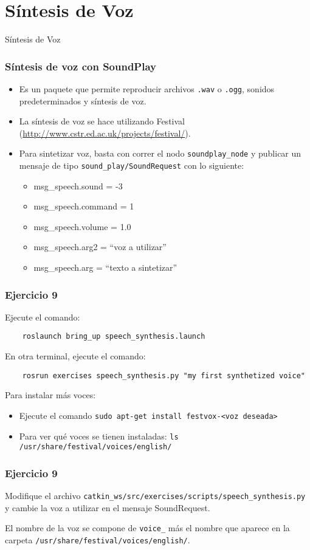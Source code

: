 \section{Síntesis de Voz}

\begin{frame}
  \Huge
  Síntesis de Voz
\end{frame}

\begin{frame}\frametitle{Síntesis de voz con SoundPlay}
  \begin{itemize}
  \item Es un paquete que permite reproducir archivos \texttt{.wav} o \texttt{.ogg}, sonidos predeterminados y síntesis de voz.
  \item La síntesis de voz se hace utilizando Festival (\url{http://www.cstr.ed.ac.uk/projects/festival/}).
  \item Para sintetizar voz, basta con correr el nodo \texttt{soundplay\_node} y publicar un mensaje de tipo \texttt{sound\_play/SoundRequest} con lo siguiente:
    \begin{itemize}
    \item msg\_speech.sound   = -3                 
    \item msg\_speech.command = 1                  
    \item msg\_speech.volume  = 1.0                
    \item msg\_speech.arg2    = ``voz a utilizar''
    \item msg\_speech.arg = ``texto a sintetizar''
    \end{itemize}
  \end{itemize}
\end{frame}

\begin{frame}[containsverbatim]\frametitle{Ejercicio 9}
  Ejecute el comando:
  \begin{lstlisting}
    roslaunch bring_up speech_synthesis.launch
  \end{lstlisting}
  En otra terminal, ejecute el comando:
  \begin{lstlisting}
    rosrun exercises speech_synthesis.py "my first synthetized voice"
  \end{lstlisting}
  Para instalar más voces:
  \begin{itemize}
  \item Ejecute el comando \texttt{sudo apt-get install festvox-<voz deseada>}
  \item Para ver qué voces se tienen instaladas: \texttt{ls /usr/share/festival/voices/english/}
  \end{itemize}
\end{frame}

\begin{frame}[containsverbatim]\frametitle{Ejercicio 9}
  Modifique el archivo \texttt{catkin\_ws/src/exercises/scripts/speech\_synthesis.py} y cambie la voz a utilizar en el mensaje SoundRequest.
  
  El nombre de la voz se compone de \texttt{voice\_} más el nombre que aparece en la carpeta \texttt{/usr/share/festival/voices/english/}. 
\end{frame}
